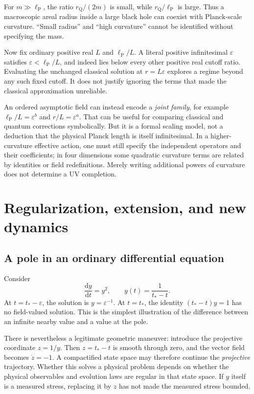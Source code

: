 \documentclass[11pt,letterpaper]{article}
\newcommand{\eps}{\varepsilon}
\newcommand{\dd}{\mathrm{d}}
\newcommand{\Planck}{\ell_{\mathrm P}}
\theoremstyle{definition}
\theoremstyle{remark}
\begin{document}
For $m\gg\Planck$, the ratio $r_{\mathrm Q}/(2m)$ is small, while
$r_{\mathrm Q}/\Planck$ is large. Thus a macroscopic areal radius inside a large
black hole can coexist with Planck-scale curvature. ``Small radius'' and
``high curvature'' cannot be identified without specifying the mass.

Now fix ordinary positive real $L$ and $\Planck/L$. A literal positive
infinitesimal $\eps$ satisfies $\eps<\Planck/L$, and indeed lies below every
other positive real cutoff ratio. Evaluating the unchanged classical solution
at $r=L\eps$ explores a regime beyond any such fixed cutoff. It does not
justify ignoring the terms that made the classical approximation unreliable.

An ordered asymptotic field can instead encode a \emph{joint family}, for
example $\Planck/L=\eps^b$ and $r/L=\eps^a$. That can be useful for comparing
classical and quantum corrections symbolically. But it is a formal scaling
model, not a deduction that the physical Planck length is itself infinitesimal.
In a higher-curvature effective action, one must still specify the independent
operators and their coefficients; in four dimensions some quadratic curvature
terms are related by identities or field redefinitions. Merely writing
additional powers of curvature does not determine a UV completion.

\section{Regularization, extension, and new dynamics}
\label{sec:regularization}

\subsection{A pole in an ordinary differential equation}

Consider
\[
 \frac{\dd y}{\dd t}=y^2,\qquad y(t)=\frac{1}{t_*-t}.
\]
At $t=t_*-\eps$, the solution is $y=\eps^{-1}$. At $t=t_*$, the identity
$(t_*-t)y=1$ has no field-valued solution. This is the simplest illustration of
the difference between an infinite nearby value and a value at the pole.

There is nevertheless a legitimate geometric maneuver: introduce the
projective coordinate $z=1/y$. Then $z=t_*-t$ is smooth through zero, and the
vector field becomes $\dot z=-1$. A compactified state space may therefore
continue the \emph{projective} trajectory. Whether this solves a physical
problem depends on whether the physical observables and evolution laws are
regular in that state space. If $y$ itself is a measured stress, replacing it
by $z$ has not made the measured stress bounded.
\end{document}
